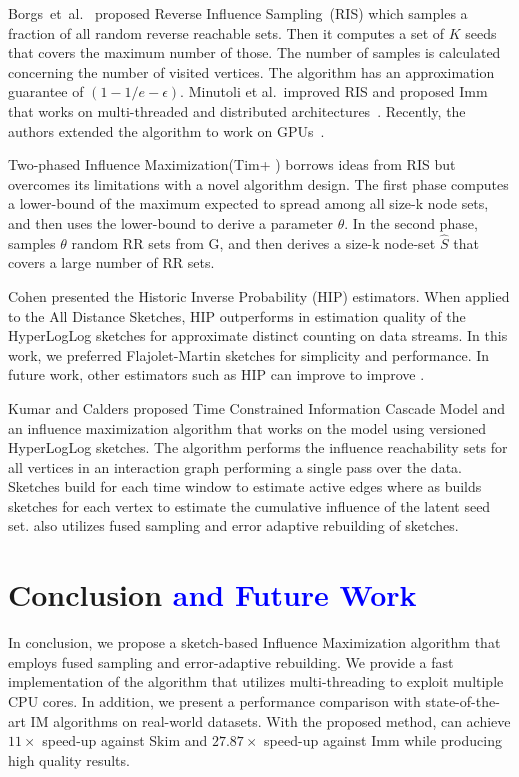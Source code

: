 \documentclass[10pt,journal,compsoc]{IEEEtran}
\newcommand\ggx[1]{\textcolor{blue}{#1}}
\newcommand\acro{{\sc{HyperFuseR\xspace}\xspace}\xspace}
\newcommand\maxspeedupIMM{{{27.87\xspace}\xspace}\xspace}
\newcommand\maxspeedupSKIM{{{11\xspace}\xspace}\xspace}
\begin{document}
Borgs~et~al.~\cite{borgs2014maximizing} proposed Reverse Influence Sampling~(RIS) which samples a fraction of all random reverse reachable sets. Then it computes a set of $K$ seeds that covers the maximum number of those. The number of samples is calculated concerning the number of visited vertices. The algorithm has an approximation guarantee of $(1-1/e-\epsilon)$. Minutoli et al.~improved RIS and proposed {\sc Imm} that works on multi-threaded and distributed architectures~\cite{minutoli2019fast}. 
Recently, the authors extended the algorithm to work on GPUs~\cite{curipples}.   

Two-phased Influence Maximization({\sc Tim+} )\cite{tim} borrows ideas from RIS but overcomes its limitations with a novel algorithm design. The first phase computes a lower-bound of the maximum expected to spread among all size-k node sets, and then uses the lower-bound to derive a parameter $\theta$. In the second phase, samples $\theta$ random RR sets from G, and then derives a size-k node-set $\hat{S}$ that covers a large number of RR sets.

Cohen\cite{cohen2015all} presented the Historic Inverse Probability (HIP) estimators. When applied to the All Distance Sketches, HIP outperforms in estimation quality of the HyperLogLog sketches\cite{flajolet2007hyperloglog} for approximate distinct counting on data streams. In this work, we preferred Flajolet-Martin\cite{flajolet1985probabilistic} sketches for simplicity and performance. In future work, other estimators such as HIP can improve to improve \acro.

Kumar and Calders\cite{kumar2017information} proposed Time Constrained Information
Cascade Model and an influence maximization algorithm that works on the model using versioned HyperLogLog sketches. The algorithm performs the influence reachability sets for all vertices in an interaction graph performing a single pass over the data. Sketches build for each time window to estimate active edges where as \acro builds sketches for each vertex to estimate the cumulative influence of the latent seed set. \acro also utilizes fused sampling and error adaptive rebuilding of sketches.

\section{Conclusion \ggx{and Future Work}}\label{sec:conclusion}

In conclusion, we propose a sketch-based Influence Maximization algorithm that employs fused sampling and error-adaptive rebuilding. We provide a fast implementation of the algorithm that utilizes multi-threading to exploit multiple CPU cores. In addition, we present a performance comparison with state-of-the-art IM algorithms on real-world datasets. 
With the proposed method, \acro{} can achieve $\maxspeedupSKIM\times$ speed-up against {\sc Skim} and $\maxspeedupIMM\times$ speed-up against {\sc Imm} while producing high quality results. 
\end{document}
